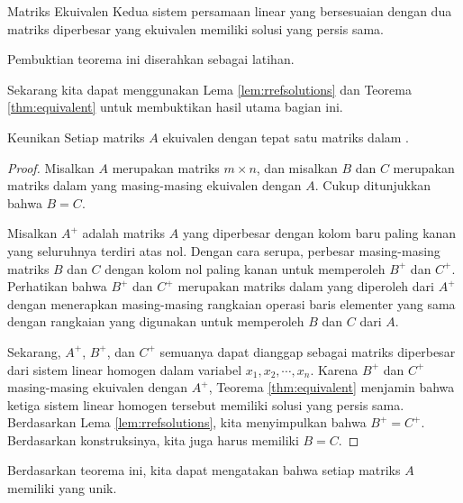 \begin{theorem}{Matriks Ekuivalen}\label{thm:equivalent}
Kedua sistem persamaan linear yang bersesuaian dengan dua matriks diperbesar yang ekuivalen memiliki solusi yang persis sama.
\end{theorem}

Pembuktian teorema ini diserahkan sebagai latihan.

Sekarang kita dapat menggunakan Lema \ref{lem:rrefsolutions} dan Teorema \ref{thm:equivalent} untuk membuktikan hasil utama bagian ini.

\begin{theorem}{Keunikan \RREF}\label{thm:uniquerref}
Setiap matriks $A$ ekuivalen dengan tepat satu matriks dalam \rref.
\end{theorem}

\ifdefined\showproofs
\begin{proof}
Misalkan $A$ merupakan matriks $m \times n$, dan misalkan $B$ dan $C$ merupakan matriks dalam \rref{} yang masing-masing ekuivalen dengan $A$. Cukup ditunjukkan bahwa $B=C$.

Misalkan $A^{+}$ adalah matriks $A$ yang diperbesar dengan kolom baru paling kanan yang seluruhnya terdiri atas nol. Dengan cara serupa, perbesar masing-masing matriks $B$ dan $C$ dengan kolom nol paling kanan untuk memperoleh $B^{+}$ dan $C^{+}$. Perhatikan bahwa $B^{+}$ dan $C^{+}$
merupakan matriks dalam \rref \;yang diperoleh dari $A^{+}$ dengan menerapkan masing-masing rangkaian operasi baris elementer yang sama dengan rangkaian yang digunakan untuk memperoleh $B$ dan $C$ dari $A$.

Sekarang, $A^{+}$, $B^{+}$, dan $C^{+}$ semuanya dapat dianggap sebagai matriks diperbesar dari sistem linear homogen dalam variabel $x_1, x_2, \cdots, x_n$. Karena $B^{+}$ dan $C^{+}$ masing-masing ekuivalen dengan $A^{+}$, Teorema \ref{thm:equivalent} menjamin bahwa ketiga sistem linear homogen tersebut memiliki solusi yang persis sama. Berdasarkan Lema \ref{lem:rrefsolutions}, kita menyimpulkan bahwa $B^{+}=C^{+}$. Berdasarkan konstruksinya, kita juga harus memiliki $B=C$.
\end{proof}
\fi
Berdasarkan teorema ini, kita dapat mengatakan bahwa setiap matriks $A$ memiliki \rref{} yang unik.
